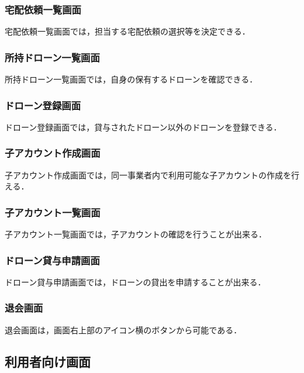 \documentclass[a4paper, titlepage]{jsarticle}
\begin{document}
\subsubsection{宅配依頼一覧画面}
宅配依頼一覧画面では，担当する宅配依頼の選択等を決定できる．
\subsubsection{所持ドローン一覧画面}
所持ドローン一覧画面では，自身の保有するドローンを確認できる．
\clearpage
\subsubsection{ドローン登録画面}
ドローン登録画面では，貸与されたドローン以外のドローンを登録できる．
\subsubsection{子アカウント作成画面}
子アカウント作成画面では，同一事業者内で利用可能な子アカウントの作成を行える．
\clearpage
\subsubsection{子アカウント一覧画面}
子アカウント一覧画面では，子アカウントの確認を行うことが出来る．
\subsubsection{ドローン貸与申請画面}
ドローン貸与申請画面では，ドローンの貸出を申請することが出来る．
\clearpage
\subsubsection{退会画面}
退会画面は，画面右上部のアイコン横のボタンから可能である．
\clearpage

\subsection{利用者向け画面}
\end{document}
